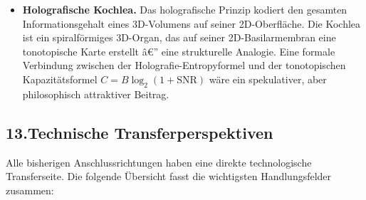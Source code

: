 ﻿\documentclass[12pt,a4paper,titlepage]{report}
\begin{document}
\begin{itemize}[leftmargin=2em]
    also in einem Umfeld, das Quantenkohärenz normalerweise
    sehr schnell dephasiert ($\tau_{\rm kohärenz} \lesssim 10^{-13}\,\mathrm{s}$).
    Dennoch hat jüngste Forschung (Fleming et al., 2007;
    Engel et al., 2007 zu Photorezeptoren)
    gezeigt, dass Quantenkohärenz in biologischen Systemen
    bei Raumtemperatur messbar ist.
    Könnten Haarzell-Transduktionskanäle quantenmechanische
    Effekte nutzen, um ihre Empfindlichkeit unter die klassische
    thermodynamische Rauschgrenze zu senken?
    Derzeit ist dies hochspekulativ, aber theoretisch nicht ausgeschlossen.
  \item \textbf{Holografische Kochlea.}
    Das holografische Prinzip kodiert den gesamten Informationsgehalt
    eines 3D-Volumens auf seiner 2D-Oberfläche.
    Die Kochlea ist ein spiralförmiges 3D-Organ,
    das auf seiner 2D-Basilarmembran eine tonotopische Karte erstellt â€”
    eine strukturelle Analogie.
    Eine formale Verbindung zwischen der Holografie-Entropyformel
    und der tonotopischen Kapazitätsformel
    $C = B \log_2(1 + \mathrm{SNR})$ wäre ein spekulativer, aber
    philosophisch attraktiver Beitrag.
\end{itemize}

\subsection*{13.\enspace Technische Transferperspektiven}

Alle bisherigen Anschlussrichtungen haben eine direkte
technologische Transferseite.
Die folgende Übersicht fasst die wichtigsten
Handlungsfelder zusammen:
\end{document}
